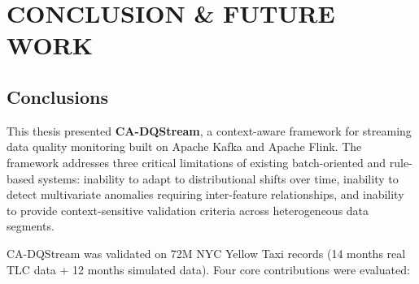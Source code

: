 \newpage
\chapter{CONCLUSION \& FUTURE WORK}
\pagestyle{fancy}

\section{Conclusions}

This thesis presented \textbf{CA-DQStream}, a context-aware framework for streaming data quality monitoring built on Apache Kafka and Apache Flink. The framework addresses three critical limitations of existing batch-oriented and rule-based systems: inability to adapt to distributional shifts over time, inability to detect multivariate anomalies requiring inter-feature relationships, and inability to provide context-sensitive validation criteria across heterogeneous data segments.

CA-DQStream was validated on 72M NYC Yellow Taxi records (14 months real TLC data + 12 months simulated data). Four core contributions were evaluated:

